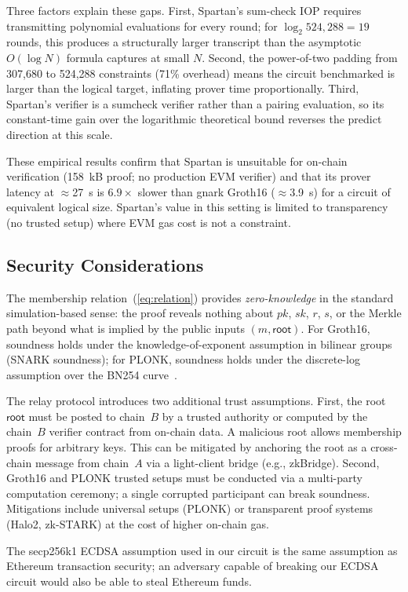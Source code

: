 \documentclass[conference]{IEEEtran}
\begin{document}
Three factors explain these gaps.
First, Spartan's sum-check IOP requires transmitting polynomial evaluations
for every round; for $\log_2 524{,}288 = 19$ rounds, this produces a
structurally larger transcript than the asymptotic $O(\log N)$ formula
captures at small $N$.
Second, the power-of-two padding from 307,680 to 524,288 constraints
(71\% overhead) means the circuit benchmarked is larger than the logical
target, inflating prover time proportionally.
Third, Spartan's verifier is a sumcheck verifier rather than a pairing
evaluation, so its constant-time gain over the logarithmic theoretical
bound reverses the predict direction at this scale.

These empirical results confirm that Spartan is unsuitable for on-chain
verification (158~kB proof; no production EVM verifier) and that its
prover latency at $\approx$27~s is $6.9\times$ slower than gnark Groth16
($\approx$3.9~s) for a circuit of equivalent logical size.
Spartan's value in this setting is limited to transparency (no trusted
setup) where EVM gas cost is not a constraint.

\subsection{Security Considerations}

The membership relation~(\ref{eq:relation}) provides \emph{zero-knowledge}
in the standard simulation-based sense: the proof reveals nothing about
$pk$, $sk$, $r$, $s$, or the Merkle path beyond what is implied by the
public inputs $(m, \mathsf{root})$.
For Groth16, soundness holds under the knowledge-of-exponent assumption
in bilinear groups (SNARK soundness); for PLONK, soundness holds under
the discrete-log assumption over the BN254 curve~\cite{PLONK}.

The relay protocol introduces two additional trust assumptions.
First, the root $\mathsf{root}$ must be posted to chain~$B$ by a
trusted authority or computed by the chain~$B$ verifier contract from
on-chain data.
A malicious root allows membership proofs for arbitrary keys.
This can be mitigated by anchoring the root as a cross-chain message
from chain~$A$ via a light-client bridge (e.g., zkBridge).
Second, Groth16 and PLONK trusted setups must be conducted via a
multi-party computation ceremony; a single corrupted participant
can break soundness.
Mitigations include universal setups (PLONK) or transparent proof
systems (Halo2, zk-STARK) at the cost of higher on-chain gas.

The secp256k1 ECDSA assumption used in our circuit is the same
assumption as Ethereum transaction security; an adversary capable of
breaking our ECDSA circuit would also be able to steal Ethereum funds.
\end{document}
